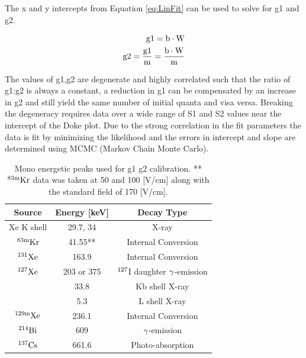 \noindent The x and y intercepts from Equation \ref{eq:LinFit} can be used to solve for g1 and g2. 

\begin{equation}
\begin{split}
\rm g1=b\cdot W \\
\rm g2=\frac{g1}{m}=\frac{b\cdot W}{m}
\label{eq:g1g2_linfit}
\end{split}
\end{equation}


The values of g1,g2 are degenerate and highly correlated such that the ratio of g1:g2 is always a constant, a reduction in g1 can be compensated by an increase in g2 and still yield the same number of initial quanta and visa versa. Breaking the degeneracy requires data over a wide range of S1 and S2 values near the intercept of the Doke plot. Due to the strong correlation in the fit parameters the data is fit by minimizing the likelihood and the errors in intercept and slope are determined using MCMC (Markov Chain Monte Carlo). 




\begin{table}[h!]
\centering
\footnotesize
\begin{tabular}{|c|c|c|}
\hline
Source & Energy [keV] &Decay Type  \\ [0.5ex] %
\hline
Xe K shell  & 29.7, 34 	 		& X-ray							\\ \hline
 $\rm ^{83m}Kr$ 	& 41.55**		& Internal Conversion			\\ \hline
 $\rm ^{131}Xe$ 	& 163.9		& Internal Conversion			\\ \hline
$\rm ^{127}Xe$ 	& 203 or 375	& $\rm^{127}$I daughter $\rm \gamma$-emission	\\ \hline
				      & 33.8			& Kb shell X-ray 						\\ \hline
				      & 5.3			& L shell X-ray 					\\ \hline
$\rm ^{129m}Xe$	& 236.1		& Internal Conversion 			\\ \hline
$\rm ^{214}Bi	$	& 609 			& $\rm \gamma$-emission				 \\ \hline
 $\rm ^{137}Cs$	& 661.6		& Photo-absorption 					\\ [0.5ex] 
\hline
\end{tabular}
\caption{Mono energetic peaks used for g1 g2 calibration. ** $\rm^{83m}Kr$ data was taken at 50 and 100 [V/cm] along with the standard field of 170 [V/cm].}
\label{table:Cal_lines}
\end{table}



